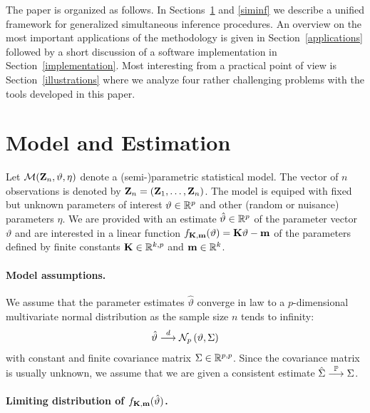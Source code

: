 \documentclass[12pt]{article}
\begin{document}
The paper is organized as follows. In Sections~\ref{model} and \ref{siminf} we
describe a unified framework for generalized simultaneous inference
procedures. An overview on the most important applications
of the methodology is given in Section~\ref{applications} followed
by a short discussion of a software implementation in Section~\ref{implementation}.
Most interesting from a practical point of view is 
Section~\ref{illustrations} where we analyze four rather challenging
problems with the tools developed in this paper.

\section{Model and Estimation} \label{model}

Let $\mathcal{M}(\mathbf{Z}_n, \vartheta, \eta)$ denote a (semi-)parametric statistical model.
The vector of $n$ observations is denoted by $\mathbf{Z}_n = (\mathbf{Z}_1, \dots, \mathbf{Z}_n)$. 
The model is equiped with fixed
but unknown parameters of interest $\vartheta \in \mathbb{R}^p$ 
and other (random or nuisance) parameters $\eta$. We are provided 
with an estimate $\hat{\vartheta} \in \mathbb{R}^p$ of the parameter 
vector $\vartheta$ and are interested in a linear
function $f_{\mathbf{K}, \mathbf{m}}(\vartheta) = \mathbf{K} \vartheta - \mathbf{m}$
of the parameters defined by finite constants $\mathbf{K} \in \mathbb{R}^{k, p}$
and $\mathbf{m} \in \mathbb{R}^k$.

\paragraph{Model assumptions.}

We assume that the parameter estimates $\hat{\vartheta}$ converge in law
to a $p$-dimensional multivariate normal distribution as the sample
size $n$ tends to infinity:
\begin{eqnarray} \label{normality}
\hat{\vartheta} \stackrel{d}{\longrightarrow} \mathcal{N}_p\left(\vartheta, \Sigma\right)
\end{eqnarray}
with constant and finite covariance matrix $\Sigma \in \mathbb{R}^{p,p}$.
Since the covariance matrix is usually unknown, we assume 
that we are given a consistent estimate $\hat{\Sigma} \stackrel{\mathbb{P}}{\longrightarrow} \Sigma$.

\paragraph{Limiting distribution of $f_{\mathbf{K},\mathbf{m}}(\hat{\vartheta})$.}
\end{document}
